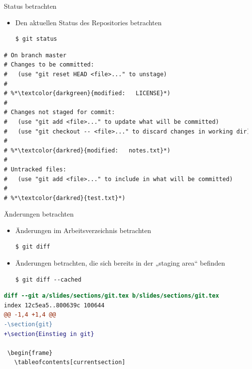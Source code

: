 \begin{frame}[fragile]{Status betrachten}
  \begin{itemize}
    \item Den aktuellen Status des Repositories betrachten
    \begin{lstlisting}
$ git status
    \end{lstlisting}
  \end{itemize}
  \begin{lstlisting}[language=diff,frame=single,caption={Ausgabe von git status}]
# On branch master
# Changes to be committed:
#   (use "git reset HEAD <file>..." to unstage)
#
# %*\textcolor{darkgreen}{modified:   LICENSE}*)
#
# Changes not staged for commit:
#   (use "git add <file>..." to update what will be committed)
#   (use "git checkout -- <file>..." to discard changes in working dir)
#
# %*\textcolor{darkred}{modified:   notes.txt}*)
#
# Untracked files:
#   (use "git add <file>..." to include in what will be committed)
#
# %*\textcolor{darkred}{test.txt}*)
  \end{lstlisting}
\end{frame}

\begin{frame}[fragile]{Änderungen betrachten}
  \begin{itemize}
    \item Änderungen im Arbeitsverzeichnis betrachten
    \begin{lstlisting}
$ git diff
    \end{lstlisting}
    \item Änderungen betrachten, die sich bereits in der „staging area“ befinden
    \begin{lstlisting}
$ git diff --cached
    \end{lstlisting}
  \end{itemize}
  \begin{lstlisting}[frame=single, caption=Ausgabe von git diff,language=diff]
diff --git a/slides/sections/git.tex b/slides/sections/git.tex
index 12c5ea5..800639c 100644
@@ -1,4 +1,4 @@
-\section{git}
+\section{Einstieg in git}

 \begin{frame}
   \tableofcontents[currentsection]
  \end{lstlisting}
\end{frame}


